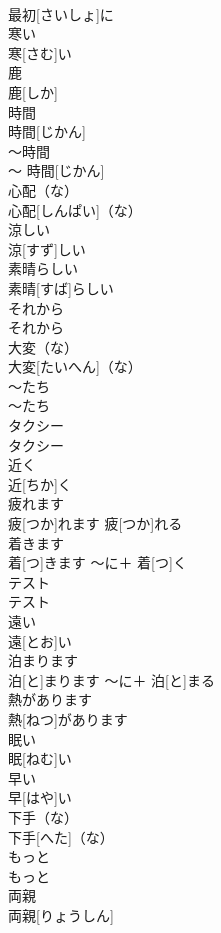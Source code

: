 \documentclass[8pt]{extreport}
\begin{document}
\begin{CJK}{UTF8}{min}
\\	最初[さいしょ]に		
\\	寒い	
\\	寒[さむ]い		
\\	鹿	
\\	鹿[しか]		
\\	時間	
\\	時間[じかん]		
\\	〜時間	
\\	〜 時間[じかん]		
\\	心配（な）	
\\	心配[しんぱい]（な）		
\\	涼しい	
\\	涼[すず]しい		
\\	素晴らしい	
\\	素晴[すば]らしい		
\\	それから	
\\	それから		
\\	大変（な）	
\\	大変[たいへん]（な）		
\\	〜たち	
\\	〜たち		
\\	タクシー	
\\	タクシー		
\\	近く	
\\	近[ちか]く		
\\	疲れます	
\\	疲[つか]れます	疲[つか]れる	
\\	着きます	
\\	着[つ]きます	〜に＋ 着[つ]く	
\\	テスト	
\\	テスト		
\\	遠い	
\\	遠[とお]い		
\\	泊まります	
\\	泊[と]まります	〜に＋ 泊[と]まる	
\\	熱があります	
\\	熱[ねつ]があります		
\\	眠い	
\\	眠[ねむ]い		
\\	早い	
\\	早[はや]い		
\\	下手（な）	
\\	下手[へた]（な）		
\\	もっと	
\\	もっと		
\\	両親	
\\	両親[りょうしん]		

\end{CJK}
\end{document}
